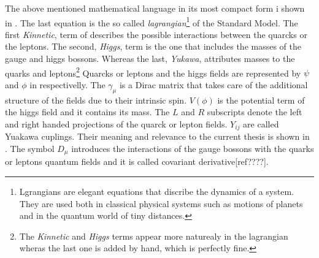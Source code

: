 The above mentioned mathematical language in its most compact form i shown in . The last equation is the so called
{\it lagrangian}\footnote{Lgrangians are elegant equations that discribe the dynamics of a system. They are used both in classical physical
systems such as motions of planets and in the quantum world of tiny distances.}
of the Standard Model. The first {\it Kinnetic}, term of  describes the possible interactions between the quarcks or the leptons.
The second, {\it Higgs}, term is the one that includes the masses of the gauge and higgs bossons. Whereas the last, {\it Yukawa}, attributes
masses to the quarks and
leptons\footnote{The {\it Kinnetic} and {\it Higgs} terms appear more naturealy in the lagrangian wheras the last one is added by hand, which is perfectly fine.}
Quarcks or leptons and the higgs fields are represented by $\psi$ and $\phi$ in  respectivelly. The $\gamma_\mu$ is a Dirac matrix
that takes care of the additional structure of the fields due to their intrinsic spin. $V(\phi)$ is the potential term of the
higgs field and it contains its mass. The $L$ and $R$ subscripts denote the left and right handed projections of the quarck or lepton fields.
$Y_{ij}$ are called Yuakawa cuplings. Their meaning and relevance to the current thesis is shown in \secref{}.
The symbol $D_\mu$ introduces the interactions of the gauge bossons with the quarks or leptons quantum fields and it is called covariant derivative[ref????].

